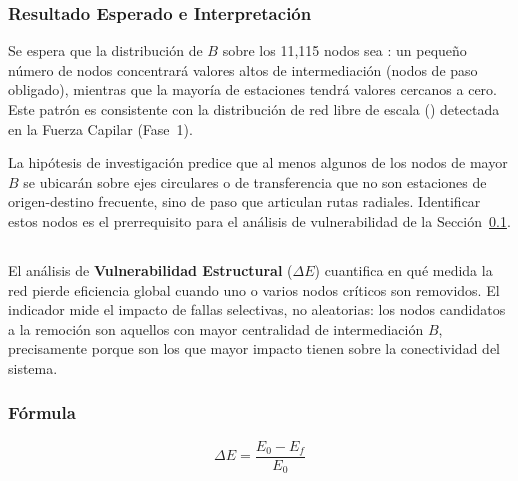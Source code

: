 \subsubsection{Resultado Esperado e Interpretación}
\label{subsubsec:b-resultado-esperado}

Se espera que la distribución de $B$ sobre los 11{,}115 nodos sea
: un pequeño número de nodos concentrará valores altos de
intermediación (nodos de paso obligado), mientras que la mayoría de estaciones
tendrá valores cercanos a cero. Este patrón es consistente con la distribución
de red libre de escala () detectada en la Fuerza Capilar
(Fase~1).

La hipótesis de investigación predice que al menos algunos de los nodos de mayor
$B$ se ubicarán sobre ejes circulares o de transferencia que no son estaciones
de origen-destino frecuente, sino  de paso que articulan rutas
radiales. Identificar estos nodos es el prerrequisito para el análisis de
vulnerabilidad de la Sección~\ref{subsec:vulnerabilidad}.

\subsection{}
\label{subsec:vulnerabilidad}


El análisis de \textbf{Vulnerabilidad Estructural} ($\Delta E$) cuantifica en
qué medida la red pierde eficiencia global cuando uno o varios nodos críticos
son removidos. El indicador mide el impacto de fallas selectivas, no aleatorias:
los nodos candidatos a la remoción son aquellos con mayor centralidad de
intermediación $B$, precisamente porque son los que mayor impacto tienen sobre
la conectividad del sistema.

\subsubsection{Fórmula}
\label{subsubsec:formula-deltae}

\begin{equation}
    \Delta E = \frac{E_0 - E_f}{E_0}
    \label{eq:vulnerabilidad}
\end{equation}

